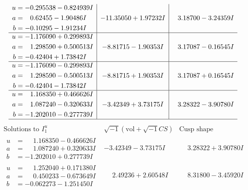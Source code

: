 \documentclass[1p]{elsarticle_modified}
\theoremstyle{definition}
\newcommand{\I}{\sqrt{-1}}
\begin{document}
$$\begin{array}{c|c|c}
\begin{aligned}
u &= -0.295538 - 0.824939 I \\
a &= \phantom{-}0.62455 - 1.90486 I \\
b &= -0.10295 - 1.91234 I\end{aligned}
 & -11.35050 + 1.97232 I & \phantom{-}3.18700 - 3.24359 I \\ \hline\begin{aligned}
u &= -1.176090 + 0.299893 I \\
a &= \phantom{-}1.298590 + 0.500513 I \\
b &= -0.42404 + 1.73842 I\end{aligned}
 & -8.81715 - 1.90353 I & \phantom{-}3.17087 - 0.16545 I \\ \hline\begin{aligned}
u &= -1.176090 - 0.299893 I \\
a &= \phantom{-}1.298590 - 0.500513 I \\
b &= -0.42404 - 1.73842 I\end{aligned}
 & -8.81715 + 1.90353 I & \phantom{-}3.17087 + 0.16545 I \\ \hline\begin{aligned}
u &= \phantom{-}1.168350 + 0.466626 I \\
a &= \phantom{-}1.087240 - 0.320633 I \\
b &= -1.202010 - 0.277739 I\end{aligned}
 & -3.42349 + 3.73175 I & \phantom{-}3.28322 - 3.90780 I\\
 \hline 
 \end{array}$$\newpage$$\begin{array}{c|c|c}  
\text{Solutions to }I^u_{1}& \I (\text{vol} + \sqrt{-1}CS) & \text{Cusp shape}\\
 \hline 
\begin{aligned}
u &= \phantom{-}1.168350 - 0.466626 I \\
a &= \phantom{-}1.087240 + 0.320633 I \\
b &= -1.202010 + 0.277739 I\end{aligned}
 & -3.42349 - 3.73175 I & \phantom{-}3.28322 + 3.90780 I \\ \hline\begin{aligned}
u &= \phantom{-}1.252040 + 0.171380 I \\
a &= \phantom{-}0.450233 - 0.673649 I \\
b &= -0.062273 - 1.251450 I\end{aligned}
 & \phantom{-}2.49236 + 2.60548 I & \phantom{-}8.31800 - 3.45920 I \\ \hline\begin{aligned}

\end{aligned}
\end{array}$$
\end{document}
